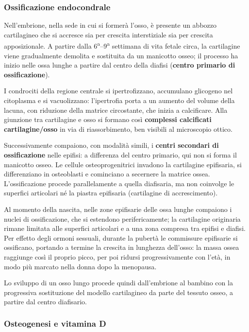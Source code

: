\subsubsection{Ossificazione endocondrale}

Nell'embrione, nella sede in cui si formerà l'osso, è presente un abbozzo
cartilagineo che si accresce sia per crescita interstiziale sia per crescita
apposizionale. A partire dalla 6\textsuperscript{a}--9\textsuperscript{a}
settimana di vita fetale circa, la cartilagine viene gradualmente demolita e
sostituita da un manicotto osseo; il processo ha inizio nelle ossa lunghe a
partire dal centro della diafisi (\textbf{centro primario di
ossificazione}).

I condrociti della regione centrale si ipertrofizzano, accumulano glicogeno
nel citoplasma e si vacuolizzano: l'ipertrofia porta a un aumento del volume
della lacuna, con riduzione della matrice circostante, che inizia a
calcificare. Alla giunzione tra cartilagine e osso si formano così
\textbf{complessi calcificati cartilagine/osso} in via di riassorbimento,
ben visibili al microscopio ottico.

Successivamente compaiono, con modalità simili, i \textbf{centri secondari
di ossificazione} nelle epifisi: a differenza del centro primario, qui non si
forma il manicotto osseo. Le cellule osteoprogenitrici invadono la
cartilagine epifisaria, si differenziano in osteoblasti e cominciano a
secernere la matrice ossea. L'ossificazione procede parallelamente a quella
diafisaria, ma non coinvolge le superfici articolari né la piastra
epifisaria (cartilagine di accrescimento).

Al momento della nascita, nelle zone epifisarie delle ossa lunghe compaiono
i nuclei di ossificazione, che si estendono perifericamente; la cartilagine
originaria rimane limitata alle superfici articolari e a una zona compresa
tra epifisi e diafisi. Per effetto degli ormoni sessuali, durante la
pubertà le commissure epifisarie si ossificano, portando a termine la
crescita in lunghezza dell'osso: la massa ossea raggiunge così il proprio
picco, per poi ridursi progressivamente con l'età, in modo più marcato nella
donna dopo la menopausa.

Lo sviluppo di un osso lungo procede quindi dall'embrione al bambino con la
progressiva sostituzione del modello cartilagineo da parte del tessuto osseo,
a partire dal centro diafisario.

\subsubsection{Osteogenesi e vitamina D}

